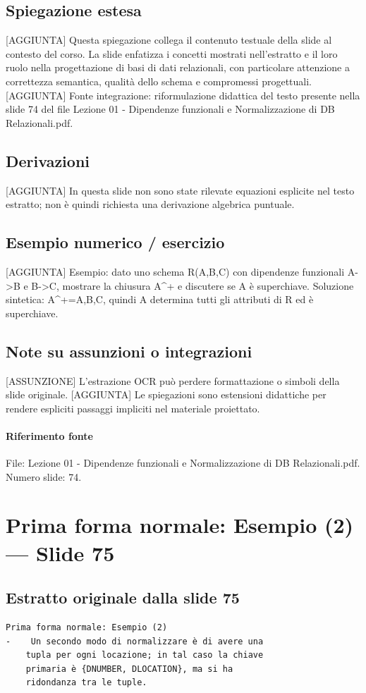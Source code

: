 \documentclass[11pt]{article}
\begin{document}
\subsection*{Spiegazione estesa}
[AGGIUNTA] Questa spiegazione collega il contenuto testuale della slide al contesto del corso. La slide enfatizza i concetti mostrati nell'estratto e il loro ruolo nella progettazione di basi di dati relazionali, con particolare attenzione a correttezza semantica, qualità dello schema e compromessi progettuali.
[AGGIUNTA] Fonte integrazione: riformulazione didattica del testo presente nella slide 74 del file Lezione 01 - Dipendenze funzionali e Normalizzazione di DB Relazionali.pdf.
\subsection*{Derivazioni}
[AGGIUNTA] In questa slide non sono state rilevate equazioni esplicite nel testo estratto; non è quindi richiesta una derivazione algebrica puntuale.
\subsection*{Esempio numerico / esercizio}
[AGGIUNTA] Esempio: dato uno schema R(A,B,C) con dipendenze funzionali A->B e B->C, mostrare la chiusura A^+ e discutere se A è superchiave. Soluzione sintetica: A^+={A,B,C}, quindi A determina tutti gli attributi di R ed è superchiave.
\subsection*{Note su assunzioni o integrazioni}
[ASSUNZIONE] L'estrazione OCR può perdere formattazione o simboli della slide originale.
[AGGIUNTA] Le spiegazioni sono estensioni didattiche per rendere espliciti passaggi impliciti nel materiale proiettato.
\paragraph{Riferimento fonte} File: Lezione 01 - Dipendenze funzionali e Normalizzazione di DB Relazionali.pdf. Numero slide: 74.
\section{Prima forma normale: Esempio (2) --- Slide 75}
\subsection*{Estratto originale dalla slide 75}
\begin{lstlisting}
Prima forma normale: Esempio (2)
-    Un secondo modo di normalizzare è di avere una
    tupla per ogni locazione; in tal caso la chiave
    primaria è {DNUMBER, DLOCATION}, ma si ha
    ridondanza tra le tuple.
\end{lstlisting}
\end{document}
